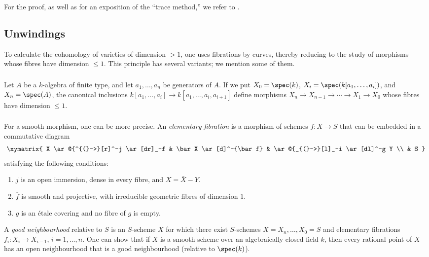 For the proof, as well as for an exposition of the “trace method,” we
refer to .

\subsection{Unwindings}\label{I:3-4}

To calculate the cohomology of varieties of dimension $>1$, one uses
fibrations by curves, thereby reducing to the study of morphisms whose
fibres have dimension $\leqslant1$. This principle has several variants;
we mention some of them.

\subsubsection{}\label{I:3-4-1}

Let $A$ be a $k$-algebra of finite type, and let $a_1,\dotsc,a_n$ be
generators of $A$. If we put $X_0=\spec(k)$,
$X_i=\spec(k[a_1,\dotsc,a_i])$, and $X_n=\spec(A)$, the canonical
inclusions
$k[a_1,\dotsc,a_i]\to k[a_1,\dotsc,a_i,a_{i+1}]$ define morphisms
$X_n\to X_{n-1}\to\cdots\to X_1\to X_0$ whose fibres have dimension
$\leqslant1$.

\subsubsection{}\label{I:3-4-2}

For a smooth morphism, one can be more precise. An
\emph{elementary fibration} is a morphism of schemes $f:X\to S$ that
can be embedded in a commutative diagram
\[\xymatrix{
  X \ar@{^{(}->}[r]^-j \ar[dr]_-f
    & \bar X \ar[d]^-{\bar f}
    & \ar@{_{(}->}[l]_-i \ar[dl]^-g Y \\
  & S
}\]
satisfying the following conditions:
\begin{enumerate}[\indent i)]
  \item $j$ is an open immersion, dense in every fibre, and
    $X=\bar X- Y$.
  \item $\bar f$ is smooth and projective, with irreducible geometric
    fibres of dimension $1$.
  \item $g$ is an étale covering and no fibre of $g$ is empty.
\end{enumerate}

A \emph{good neighbourhood} relative to $S$ is an $S$-scheme $X$ for
which there exist $S$-schemes $X=X_n,\dotsc,X_0=S$ and elementary
fibrations $f_i:X_i\to X_{i-1}$, $i=1,\dotsc,n$. One can show
 that if $X$ is a smooth scheme over an algebraically
closed field $k$, then every rational point of $X$ has an open
neighbourhood that is a good neighbourhood (relative to $\spec(k)$).

